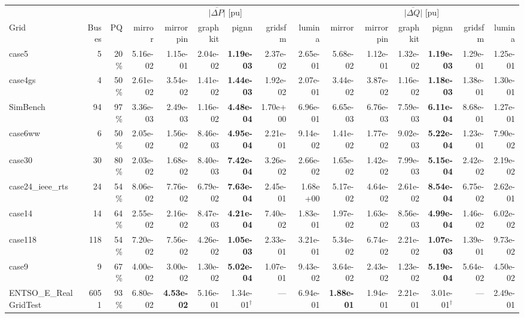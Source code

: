 \documentclass[10pt]{article}
\begin{document}
\begin{landscape}
\begin{table}[H]
\centering\scriptsize
\begin{tabular}{lrr rrrrrr rrrrrr}
\toprule
 & & & \multicolumn{6}{c}{$\overline{|\Delta P|}$ [pu]} & \multicolumn{6}{c}{$\overline{|\Delta Q|}$ [pu]} \\
\cmidrule(lr){4-9}\cmidrule(lr){10-15}
Grid & Buses & PQ & mirror & mirrorpin & graphkit & pignn & gridsfm & lumina & mirror & mirrorpin & graphkit & pignn & gridsfm & lumina \\
\midrule
case5 & 5 & 20\% & 5.16e-02 & 1.15e-01 & 2.04e-02 & \textbf{1.19e-03} & 2.37e-02 & 2.65e-01 & 5.68e-02 & 1.12e-01 & 1.32e-02 & \textbf{1.19e-03} & 1.29e-01 & 1.25e-01 \\
case4gs & 4 & 50\% & 2.61e-02 & 3.54e-02 & 1.41e-02 & \textbf{1.44e-03} & 1.92e-02 & 2.07e-01 & 3.44e-02 & 3.87e-02 & 1.16e-02 & \textbf{1.18e-03} & 1.38e-01 & 1.30e-01 \\
SimBench & 94 & 97\% & 3.36e-03 & 2.49e-03 & 1.16e-02 & \textbf{4.48e-04} & 1.70e+00 & 6.96e-01 & 6.65e-03 & 6.76e-03 & 7.59e-03 & \textbf{6.11e-04} & 8.68e-01 & 1.27e-01 \\
case6ww & 6 & 50\% & 2.05e-02 & 1.56e-02 & 8.46e-03 & \textbf{4.95e-04} & 2.21e-01 & 9.14e-02 & 1.41e-02 & 1.77e-02 & 9.02e-03 & \textbf{5.22e-04} & 1.23e-01 & 7.90e-02 \\
case30 & 30 & 80\% & 2.03e-02 & 1.68e-02 & 8.40e-03 & \textbf{7.42e-04} & 3.26e-02 & 2.66e-02 & 1.65e-02 & 1.42e-02 & 7.99e-03 & \textbf{5.15e-04} & 2.42e-02 & 2.19e-02 \\
case24\_ieee\_rts & 24 & 54\% & 8.06e-02 & 7.76e-02 & 6.79e-02 & \textbf{7.63e-04} & 2.45e-01 & 1.68e+00 & 5.17e-02 & 4.64e-02 & 2.61e-02 & \textbf{8.54e-04} & 6.75e-02 & 2.62e-01 \\
case14 & 14 & 64\% & 2.55e-02 & 2.16e-02 & 8.47e-03 & \textbf{4.21e-04} & 7.40e-02 & 1.83e-01 & 1.97e-02 & 1.63e-02 & 8.56e-03 & \textbf{4.99e-04} & 1.46e-02 & 6.02e-02 \\
case118 & 118 & 54\% & 7.20e-02 & 7.56e-02 & 4.26e-02 & \textbf{1.05e-03} & 2.33e-01 & 3.21e-01 & 5.34e-02 & 6.74e-02 & 2.21e-02 & \textbf{1.07e-03} & 1.39e-01 & 9.73e-02 \\
case9 & 9 & 67\% & 4.00e-02 & 3.00e-02 & 1.30e-02 & \textbf{5.02e-04} & 1.07e-01 & 9.43e-02 & 3.64e-02 & 2.43e-02 & 1.23e-02 & \textbf{5.19e-04} & 5.64e-02 & 4.50e-02 \\
ENTSO\_E\_RealGridTest & 6051 & 93\% & 6.80e-02 & \textbf{4.53e-02} & 5.16e-01 & 1.34e-01$^\dagger$ & --- & 6.94e-01 & \textbf{1.88e-01} & 1.94e-01 & 2.21e-01 & 3.01e-01$^\dagger$ & --- & 2.49e-01 \\

\end{tabular}
\end{table}
\end{landscape}
\end{document}
